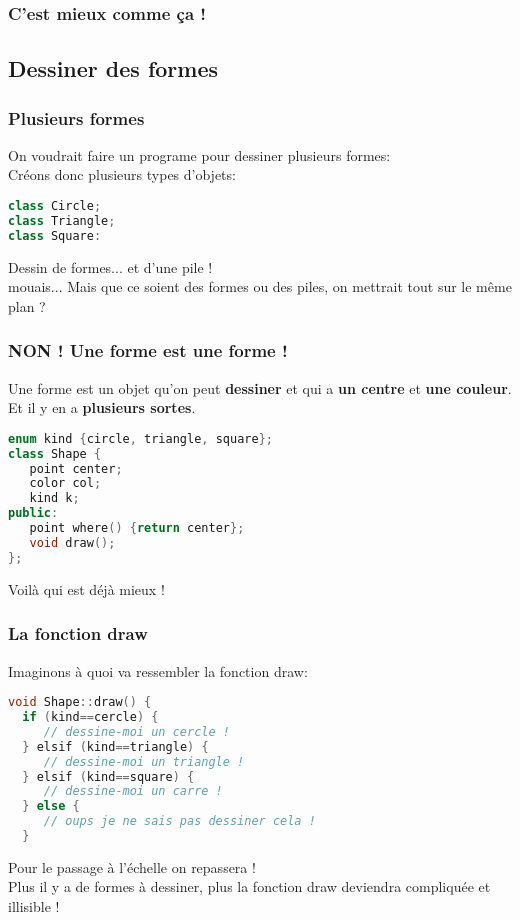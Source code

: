 \documentclass{beamer}
\begin{document}
\begin{frame}
\frametitle{C'est mieux comme ça !}
\begin{centering}
%
\par%
\end{centering}%
\end{frame}

\subsection{Dessiner des formes}
\begin{frame}[fragile=singleslide,shrink=20]
\frametitle{Plusieurs formes}
On voudrait faire un programe pour dessiner plusieurs formes: \\
Créons donc plusieurs types d'objets:
\begin{lstlisting}[language=c++]
class Circle;
class Triangle;
class Square:
\end{lstlisting}
Dessin de formes... et d'une pile ! \\
mouais... Mais que ce soient des formes ou des piles, on mettrait tout sur le même plan ?
\end{frame}

\begin{frame}[fragile=singleslide,shrink=20]
\frametitle{NON ! Une forme est une forme !}
Une forme est un objet qu'on peut \textbf{dessiner} et qui a \textbf{un centre} et \textbf{une couleur}.\\
Et il y en a \textbf{plusieurs sortes}.
\begin{lstlisting}[language=c++]
enum kind {circle, triangle, square};
class Shape {
   point center;
   color col;
   kind k;
public:
   point where() {return center};
   void draw();
};
\end{lstlisting}
Voilà qui est déjà mieux ! 
\end{frame}

\begin{frame}[fragile=singleslide,shrink=20]
\frametitle{La fonction draw}
Imaginons à quoi va ressembler la fonction draw:
\begin{lstlisting}[language=c++]
void Shape::draw() {
  if (kind==cercle) {
     // dessine-moi un cercle !
  } elsif (kind==triangle) {
     // dessine-moi un triangle !
  } elsif (kind==square) {
     // dessine-moi un carre !
  } else {
     // oups je ne sais pas dessiner cela !
  }
\end{lstlisting}
Pour le passage à l'échelle on repassera ! \\
Plus il y a de formes à dessiner, plus la fonction draw deviendra compliquée et illisible !
\end{frame}
  
\end{document}
